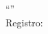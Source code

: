 \documentclass{article}
\begin{document}
  \begin{center}
    ``\titulo'' \\
    Registro: \registro
  \end{center}
\end{document}
